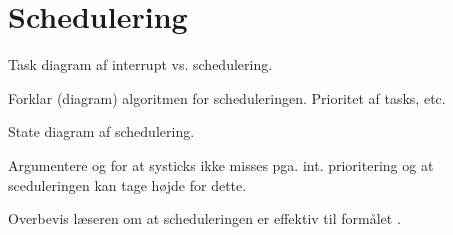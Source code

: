 \section{Schedulering}

Task diagram af interrupt vs. schedulering.

Forklar (diagram) algoritmen for scheduleringen. Prioritet af tasks, etc.

State diagram af schedulering.

Argumentere og for at systicks ikke misses pga. int. prioritering og at sceduleringen kan tage højde for dette.

Overbevis læseren om at scheduleringen er effektiv til formålet .


 

